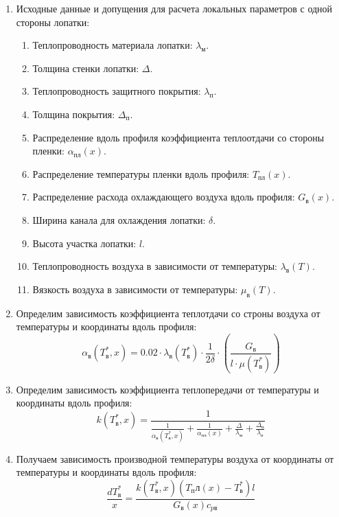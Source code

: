 \documentclass[a4paper,12pt]{article}
\begin{document}
    \begin{enumerate}

        \item Исходные данные и допущения для расчета локальных параметров с одной стороны лопатки:

        \begin{enumerate}
            \item Теплопроводность материала лопатки: $\lambda_м$.
            \item Толщина стенки лопатки: $\Delta$.
            \item Теплопроводность защитного покрытия: $\lambda_п$.
            \item Толщина покрытия: $\Delta_п$.
            \item Распределение вдоль профиля коэффициента теплоотдачи со стороны пленки: $\alpha_{пл} (x)$.
            \item Распределение температуры пленки вдоль профиля: $T_{пл} (x)$.
            \item Распределение расхода охлаждающего воздуха вдоль профиля: $G_в (x)$.
            \item Ширина канала для охлаждения лопатки: $\delta$.
            \item Высота участка лопатки: $l$.
            \item Теплопроводность воздуха в зависимости от температуры: $\lambda_в (T)$.
            \item Вязкость воздуха в зависимости от температуры: $\mu_в (T)$.
        \end{enumerate}

        \item Определим зависимость коэффициента теплотдачи со строны воздуха от температуры и координаты вдоль профиля:
        \[
            \alpha_в(T_в^*, x) = 0.02 \cdot \lambda_в \left( T_в^* \right) \cdot \frac{1}{2 \delta} \cdot
                \left(
                \frac{G_в }{l \cdot \mu \left( T_в^* \right)}
            \right)
        \]

        \item Определим зависимость коэффициента теплопередачи от температуры и координаты вдоль профиля:
        \[
            k (T_в^*, x) = \frac{1
                    }{
                \frac{1}{\alpha_в(T_в^*, x)} + \frac{1}{\alpha_{пл} (x)} + \frac{\Delta}{\lambda_м} +
                \frac{\Delta_п}{\lambda_п}
            }
        \]

        \item Получаем зависимость производной температуры воздуха от координаты от температуры и координаты
        вдоль профиля:
        \[
            \frac{dT_в^*}{x} = \frac{
                    k (T_в^*, x) (T_пл(x) - T_в^*) l
            }{
                    G_в(x) c_{pв}
            }
        \]


\end{enumerate}
\end{document}
